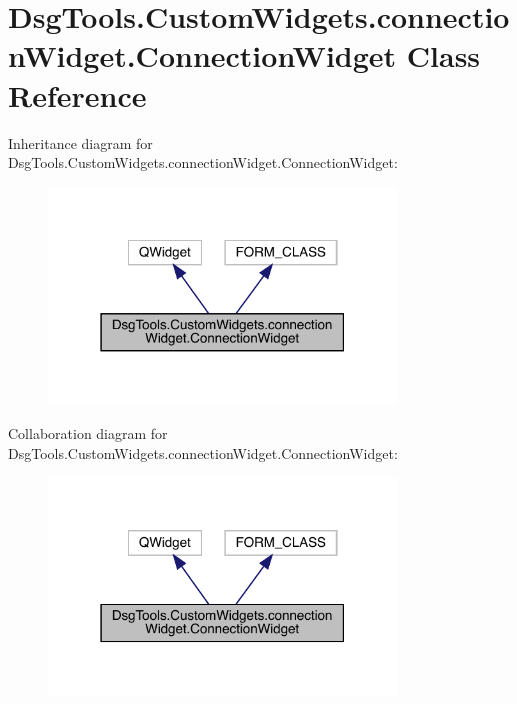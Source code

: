 \hypertarget{class_dsg_tools_1_1_custom_widgets_1_1connection_widget_1_1_connection_widget}{}\section{Dsg\+Tools.\+Custom\+Widgets.\+connection\+Widget.\+Connection\+Widget Class Reference}
\label{class_dsg_tools_1_1_custom_widgets_1_1connection_widget_1_1_connection_widget}


Inheritance diagram for Dsg\+Tools.\+Custom\+Widgets.\+connection\+Widget.\+Connection\+Widget\+:
\nopagebreak
\begin{figure}[H]
\begin{center}
\leavevmode
\includegraphics[width=262pt]{class_dsg_tools_1_1_custom_widgets_1_1connection_widget_1_1_connection_widget__inherit__graph}
\end{center}
\end{figure}


Collaboration diagram for Dsg\+Tools.\+Custom\+Widgets.\+connection\+Widget.\+Connection\+Widget\+:
\nopagebreak
\begin{figure}[H]
\begin{center}
\leavevmode
\includegraphics[width=262pt]{class_dsg_tools_1_1_custom_widgets_1_1connection_widget_1_1_connection_widget__coll__graph}
\end{center}
\end{figure}
